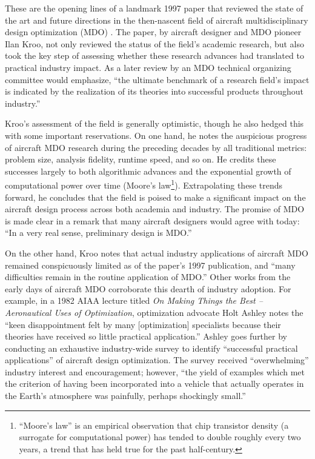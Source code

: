 \documentclass[12pt,vi,oneside]{report}
\begin{document}
    These are the opening lines of a landmark 1997 paper that reviewed the state of the art and future directions in the then-nascent field of aircraft multidisciplinary design optimization (MDO) \cite{kroo_multidisciplinary_1997}. The paper, by aircraft designer and MDO pioneer Ilan Kroo, not only reviewed the status of the field's academic research, but also took the key step of assessing whether these research advances had translated to practical industry impact. As a later review by an MDO technical organizing committee would emphasize, ``the ultimate benchmark of a research field's impact is indicated by the realization of its theories into successful products throughout industry.'' \cite{agte_mdo_2010}

    Kroo's assessment of the field is generally optimistic, though he also hedged this with some important reservations. On one hand, he notes the auspicious progress of aircraft MDO research during the preceding decades by all traditional metrics: problem size, analysis fidelity, runtime speed, and so on. He credits these successes largely to both algorithmic advances and the exponential growth of computational power over time (Moore's law\footnote{``Moore's law'' is an empirical observation that chip transistor density (a surrogate for computational power) has tended to double roughly every two years, a trend that has held true for the past half-century.}). Extrapolating these trends forward, he concludes that the field is poised to make a significant impact on the aircraft design process across both academia and industry. The promise of MDO is made clear in a remark that many aircraft designers would agree with today: ``In a very real sense, preliminary design is MDO.'' \cite{kroo_multidisciplinary_1997}

    On the other hand, Kroo notes that actual industry applications of aircraft MDO remained conspicuously limited as of the paper's 1997 publication, and ``many difficulties remain in the routine application of MDO.'' \cite{kroo_multidisciplinary_1997} Other works from the early days of aircraft MDO corroborate this dearth of industry adoption. For example, in a 1982 AIAA lecture titled \textit{On Making Things the Best -- Aeronautical Uses of Optimization}, optimization advocate Holt Ashley notes the ``keen disappointment felt by many [optimization] specialists because their theories have received so little practical application.'' \cite{ashley_making_1982} Ashley goes further by conducting an exhaustive industry-wide survey to identify ``successful practical applications'' of aircraft design optimization. The survey received ``overwhelming'' industry interest and encouragement; however, ``the yield of examples which met the criterion of having been incorporated into a vehicle that actually operates in the Earth's atmosphere was painfully, perhaps shockingly small.''
\end{document}
